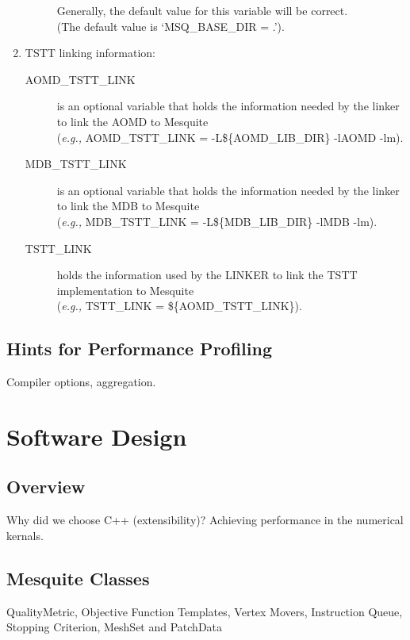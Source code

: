 \begin{enumerate}
\begin{description}
	Generally, the default value for this variable will be correct.\\
	(The default value is `MSQ\_BASE\_DIR = .').
  \end{description}
\item TSTT linking information:
\begin{description}
  \item[AOMD\_TSTT\_LINK] is an optional variable that holds the
	information needed by the linker to link the AOMD to Mesquite\\
	({\it e.g.,} AOMD\_TSTT\_LINK = -L\$\{AOMD\_LIB\_DIR\} -lAOMD -lm).
  \item[MDB\_TSTT\_LINK] is an optional variable that holds the
	information needed by the linker to link the MDB to Mesquite\\
	({\it e.g.,} MDB\_TSTT\_LINK = -L\$\{MDB\_LIB\_DIR\} -lMDB -lm).
  \item[TSTT\_LINK] holds the information used by the LINKER to link
	the TSTT implementation to Mesquite \\
	({\it e.g.,} TSTT\_LINK = \$\{AOMD\_TSTT\_LINK\}).
\end{description}
\end{enumerate}


\subsection{Hints for Performance Profiling}
Compiler options, aggregation.

\section{Software Design}

\subsection{Overview}
Why did we choose C++ (extensibility)? Achieving performance in the 
numerical kernals.

\subsection{Mesquite Classes}
QualityMetric, Objective Function Templates, Vertex Movers, Instruction Queue,
Stopping Criterion, MeshSet and PatchData

